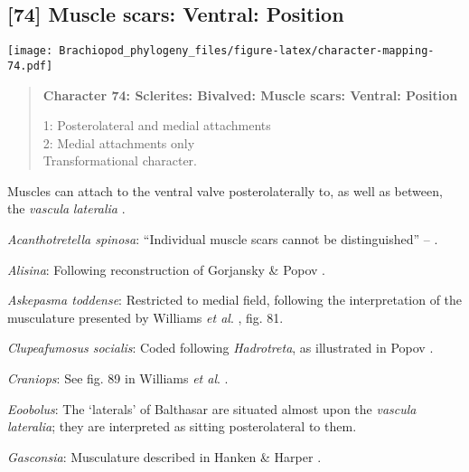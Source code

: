 \documentclass[openany]{book}
\theoremstyle{definition}
\theoremstyle{definition}
\theoremstyle{definition}
\theoremstyle{remark}
\begin{document}
\subsection*{{[}74{]} Muscle scars: Ventral:
Position}\label{muscle-scars-ventral-position}

\texttt{[image: Brachiopod\_phylogeny\_files/figure-latex/character-mapping-74.pdf]}

\begin{quote}
\textbf{Character 74: Sclerites: Bivalved: Muscle scars: Ventral:
Position}

1: Posterolateral and medial attachments\\
2: Medial attachments only\\
Transformational character.
\end{quote}

Muscles can attach to the ventral valve posterolaterally to, as well as
between, the \emph{vascula} \emph{lateralia}
\citep{Popov1992TheCambrian}.

\hypertarget{Acanthotretella_spinosa-coding-74}{}
\emph{Acanthotretella spinosa}: ``Individual muscle scars cannot be
distinguished'' -- \citet{Holmer2006Aspinose}.

\hypertarget{Alisina-coding-74}{}
\emph{Alisina}: Following reconstruction of Gorjansky \& Popov
\citeyearpar{Gorjansky1986Onthe}.

\hypertarget{Askepasma_toddense-coding-74}{}
\emph{Askepasma toddense}: Restricted to medial field, following the
interpretation of the musculature presented by Williams \emph{et al}.
\citeyearpar{Williams2000LinguliformeaCraniiformea}, fig. 81.

\hypertarget{Clupeafumosus_socialis-coding-74}{}
\emph{Clupeafumosus socialis}: Coded following \emph{Hadrotreta}, as
illustrated in Popov \citeyearpar{Popov1992TheCambrian}.

\hypertarget{Craniops-coding-74}{}
\emph{Craniops}: See fig. 89 in Williams \emph{et al}.
\citeyearpar{Williams2000LinguliformeaCraniiformea}.

\hypertarget{Eoobolus-coding-74}{}
\emph{Eoobolus}: The `laterals' of Balthasar \citeyearpar[fig.
5]{Balthasar2009Thebrachiopod} are situated almost upon the
\emph{vascula} \emph{lateralia}; they are interpreted as sitting
posterolateral to them.

\hypertarget{Gasconsia-coding-74}{}
\emph{Gasconsia}: Musculature described in Hanken \& Harper
\citeyearpar{Hanken1985Thetaxonomy}.
\end{document}
